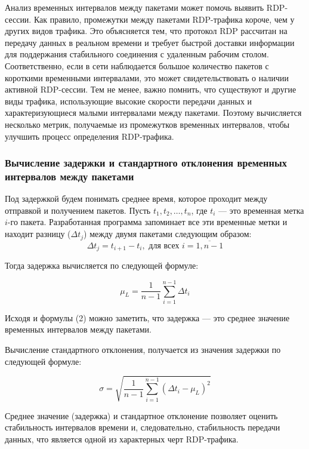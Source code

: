 \documentclass[bachelor, och, coursework]{SCWorks}
\begin{document}
Анализ временных интервалов между пакетами может помочь выявить RDP-сессии. Как правило, промежутки между пакетами RDP-трафика короче, 
чем у других видов трафика. Это объясняется тем, что протокол RDP рассчитан на передачу данных в реальном времени и требует быстрой 
доставки информации для поддержания стабильного соединения с удаленным рабочим столом. Соответственно, если в сети наблюдается 
большое количество пакетов с короткими временными интервалами, это может свидетельствовать о наличии активной RDP-сессии. Тем 
не менее, важно помнить, что существуют и другие виды трафика, использующие высокие скорости передачи данных и характеризующиеся 
малыми интервалами между пакетами. Поэтому вычисляется несколько метрик, получаемые из промежутков временных интервалов, чтобы улучшить
процесс определения RDP-трафика.

\subsubsection{Вычисление задержки и стандартного отклонения временных интервалов между пакетами}

Под задержкой будем понимать среднее время, которое проходит между отправкой и получением пакетов. Пусть $ t_1, t_2, \dots, t_n $, 
где $ t_i $ --- это временная метка $ i $-го пакета. Разработанная программа запоминает все эти временные метки и находит разницу ($\Delta t_j$) 
между двумя пакетами следующим образом:
\begin{equation}
  \Delta t_j = t_{i+1} - t_{i}, \text{ для всех } i = \overline{1, n - 1}
\end{equation}

Тогда задержка вычисляется по следующей формуле:

\begin{equation}
  \mu_L = \frac{1}{n - 1} \sum_{i=1}^{n-1} \Delta t_i
\end{equation}

Исходя и формулы (2) можно заметить, что задержка --- это среднее значение временных интервалов между пакетами.

Вычисление стандартного отклонения, получается из значения задержки по следующей формуле:

\begin{equation}
  \sigma = \sqrt{\frac{1}{n-1} \sum_{i=1}^{n-1} (\Delta t_i - \mu_L)^2}
\end{equation}

  Среднее значение (задержка) и стандартное отклонение позволяет оценить стабильность интервалов времени 
  и, следовательно, стабильность передачи данных, что является одной из характерных черт RDP-трафика.
\end{document}

